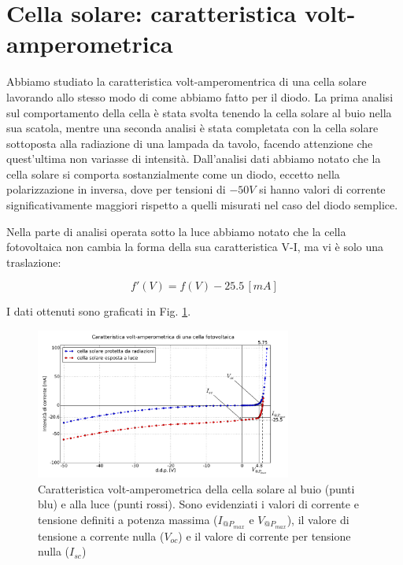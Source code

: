 \section{Cella solare: caratteristica volt-amperometrica}

Abbiamo studiato la caratteristica volt-amperomentrica di una cella solare lavorando allo stesso modo di come abbiamo fatto per il diodo.
La prima analisi sul comportamento della cella è stata svolta tenendo la cella solare al buio nella sua scatola, mentre una seconda analisi è stata completata con la cella solare sottoposta alla radiazione di una lampada da tavolo, facendo attenzione che quest'ultima non variasse di intensità.
Dall'analisi dati abbiamo notato che la cella solare si comporta sostanzialmente come un diodo, eccetto nella polarizzazione in inversa, dove per tensioni di $-50V$ si hanno valori di corrente significativamente maggiori rispetto a quelli misurati nel caso del diodo semplice. 

Nella parte di analisi operata sotto la luce abbiamo notato che la cella fotovoltaica non cambia la forma della sua caratteristica V-I, ma vi è solo una traslazione: 

$$f'(V)=f(V)-25.5 \, [mA]$$ %
 
I dati ottenuti sono graficati in Fig. \ref{fig:cella}.

\begin{figure}[h]
\center
	\includegraphics[width=0.75\textwidth]{cella.pdf}
	\caption{Caratteristica volt-amperometrica della cella solare al buio (punti blu) e alla luce (punti rossi). Sono evidenziati i valori di corrente e tensione definiti a potenza massima ($I_{@P_{max}}$ e $V_{@P_{max}}$), il valore di tensione a corrente nulla ($V_{oc}$) e il valore di corrente per tensione nulla ($I_{sc}$)}
	\label{fig:cella}
\end{figure}

